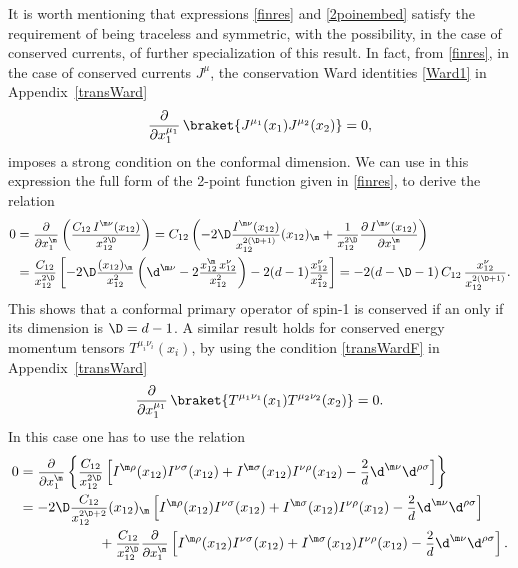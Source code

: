 \documentclass[a4paper,11pt,openright,twoside]{book}
\let\n=\nu      \let\x=\xi     \let\p=\pi      \let\r=\rho
\let\s=\sigma  \let\t=\tau     \let\u=\upsilon \let\f=\phi
\newcommand{\sdfrac}[2]{\mbox{\small$\displaystyle\frac{#1}{#2}$}}
\newcommand{\appref}[1]{Appendix~\ref{#1}}		%
\numberwithin{equation}{section}
\begin{document}
It is worth mentioning that expressions \eqref{finres} and \eqref{2poinembed} satisfy the requirement of being traceless and symmetric, with the possibility, in the case of conserved currents, of further specialization of this result. In fact, from \eqref{finres}, in the case of conserved currents $J^\mu$, the conservation Ward identities \eqref{Ward1} in \appref{transWard}
\begin{equation}
	\frac{\partial}{\partial x_1^{\mu_1}}\,\braket{J^{\mu_1}(x_1)J^{\mu_2}(x_2)}=0,
\end{equation}
imposes a strong condition on the conformal dimension. We can use in this expression the full form of the 2-point function given in \eqref{finres}, to derive the relation
\begin{align}
	0&=\sdfrac{\partial}{\partial x_1^\m}\left(\sdfrac{C_{12}\,I^{\m\n}(x_{12})}{x_{12}^{2\D}}\right)=C_{12}\left(-2\D\sdfrac{I^{\m\n}(x_{12})}{x_{12}^{2(\D+1)}}(x_{12})_\m+\sdfrac{1}{x_{12}^{2\D}}\sdfrac{\partial\,I^{\m\n}(x_{12})}{\partial x_1^\m}\right)\notag\\
	&=\sdfrac{C_{12}}{x_{12}^{2\D}}\left[-2\D\sdfrac{(x_{12})_\m}{x_{12}^2}\left(\d^{\m\n}-2\sdfrac{x_{12}^\m\,x_{12}^\n}{x_{12}^2}\right)-2(d-1)\sdfrac{x_{12}^\n}{x_{12}^2}\right]=-2(d-\D-1)\,C_{12}\,\sdfrac{x_{12}^\n}{x_{12}^{2(\D+1)}}.
\end{align}
This shows that a conformal primary operator of spin-1 is conserved if an only if its dimension is $\D=d-1$. A similar result holds for conserved energy momentum tensors $T^{\mu_i\nu_i}(x_i)$, by using the condition \eqref{transWardF} in \appref{transWard}
\begin{equation}
	\frac{\partial}{\partial x_1^{\mu_1}}\,\braket{T^{\mu_1\nu_1}(x_1)T^{\mu_2\nu_2}(x_2)}=0.
\end{equation}
In this case one has to use the relation 
\begin{align}
	0&=\sdfrac{\partial}{\partial x_1^\m}\left\{\sdfrac{C_{12}}{x_{12}^{2\D}}\left[I^{\m\r}(x_{12})I^{\n\s}(x_{12})+I^{\m\s}(x_{12})I^{\n\r}(x_{12})-\sdfrac{2}{d}\d^{\m\n}\d^{\r\s}\right]\right\}\notag\\
	&=-2\D\sdfrac{C_{12}}{x_{12}^{2\D+2}}(x_{12})_\m\left[I^{\m\r}(x_{12})I^{\n\s}(x_{12})+I^{\m\s}(x_{12})I^{\n\r}(x_{12})-\sdfrac{2}{d}\d^{\m\n}\d^{\r\s}\right]\notag\\
	&\hspace{2cm}+\sdfrac{C_{12}}{x_{12}^{2\D}}\sdfrac{\partial}{\partial x_1^\m}\left[I^{\m\r}(x_{12})I^{\n\s}(x_{12})+I^{\m\s}(x_{12})I^{\n\r}(x_{12})-\sdfrac{2}{d}\d^{\m\n}\d^{\r\s}\right].\label{3A}
\end{align}
\end{document}
